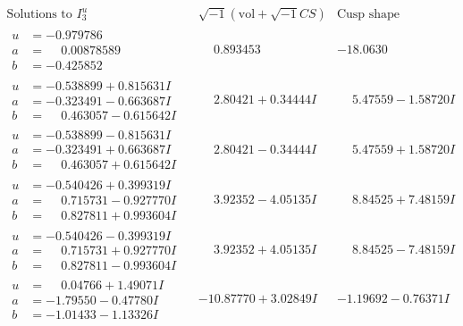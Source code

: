 \documentclass[1p]{elsarticle_modified}
\theoremstyle{definition}
\newcommand{\I}{\sqrt{-1}}
\begin{document}
$$\begin{array}{c|c|c}  
\text{Solutions to }I^u_{3}& \I (\text{vol} + \sqrt{-1}CS) & \text{Cusp shape}\\
 \hline 
\begin{aligned}
u &= -0.979786\phantom{ +0.000000I} \\
a &= \phantom{-}0.00878589\phantom{ +0.000000I} \\
b &= -0.425852\phantom{ +0.000000I}\end{aligned}
 & \phantom{-}0.893453\phantom{ +0.000000I} & -18.0630\phantom{ +0.000000I} \\ \hline\begin{aligned}
u &= -0.538899 + 0.815631 I \\
a &= -0.323491 - 0.663687 I \\
b &= \phantom{-}0.463057 - 0.615642 I\end{aligned}
 & \phantom{-}2.80421 + 0.34444 I & \phantom{-}5.47559 - 1.58720 I \\ \hline\begin{aligned}
u &= -0.538899 - 0.815631 I \\
a &= -0.323491 + 0.663687 I \\
b &= \phantom{-}0.463057 + 0.615642 I\end{aligned}
 & \phantom{-}2.80421 - 0.34444 I & \phantom{-}5.47559 + 1.58720 I \\ \hline\begin{aligned}
u &= -0.540426 + 0.399319 I \\
a &= \phantom{-}0.715731 - 0.927770 I \\
b &= \phantom{-}0.827811 + 0.993604 I\end{aligned}
 & \phantom{-}3.92352 - 4.05135 I & \phantom{-}8.84525 + 7.48159 I \\ \hline\begin{aligned}
u &= -0.540426 - 0.399319 I \\
a &= \phantom{-}0.715731 + 0.927770 I \\
b &= \phantom{-}0.827811 - 0.993604 I\end{aligned}
 & \phantom{-}3.92352 + 4.05135 I & \phantom{-}8.84525 - 7.48159 I \\ \hline\begin{aligned}
u &= \phantom{-}0.04766 + 1.49071 I \\
a &= -1.79550 - 0.47780 I \\
b &= -1.01433 - 1.13326 I\end{aligned}
 & -10.87770 + 3.02849 I & -1.19692 - 0.76371 I \\ \hline\begin{aligned}

\end{aligned}
\end{array}$$
\end{document}
